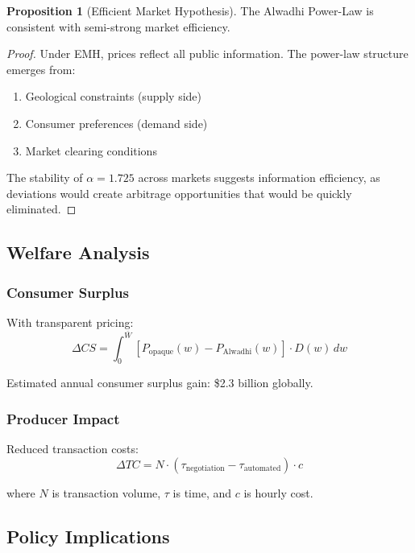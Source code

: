 \documentclass[12pt,a4paper]{article}
\theoremstyle{definition}
\newtheorem{proposition}{Proposition}
\theoremstyle{remark}
\begin{document}
\begin{proposition}[Efficient Market Hypothesis]
The Alwadhi Power-Law is consistent with semi-strong market efficiency.
\end{proposition}

\begin{proof}
Under EMH, prices reflect all public information. The power-law structure emerges from:
\begin{enumerate}
\item Geological constraints (supply side)
\item Consumer preferences (demand side)
\item Market clearing conditions
\end{enumerate}

The stability of $\alpha = 1.725$ across markets suggests information efficiency, as deviations would create arbitrage opportunities that would be quickly eliminated.
\end{proof}

\subsection{Welfare Analysis}

\subsubsection{Consumer Surplus}

With transparent pricing:
\begin{equation}
\Delta CS = \int_0^{\bar{W}} [P_{\text{opaque}}(w) - P_{\text{Alwadhi}}(w)] \cdot D(w) \, dw
\end{equation}

Estimated annual consumer surplus gain: \$2.3 billion globally.

\subsubsection{Producer Impact}

Reduced transaction costs:
\begin{equation}
\Delta TC = N \cdot (\tau_{\text{negotiation}} - \tau_{\text{automated}}) \cdot c
\end{equation}

where $N$ is transaction volume, $\tau$ is time, and $c$ is hourly cost.

\subsection{Policy Implications}
\end{document}

